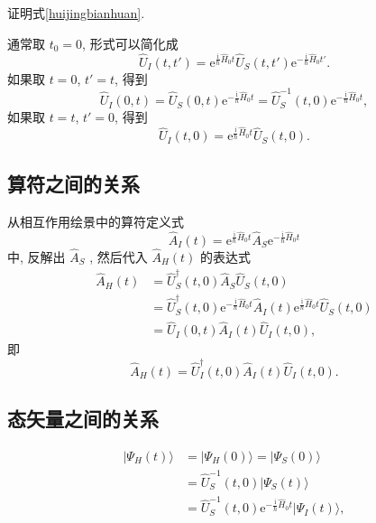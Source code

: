 \begin{question}{}{}
证明式\eqref{huijingbianhuan}.
\end{question}

通常取 $t_0=0$, 形式可以简化成
\begin{equation}
   \hat U_I(t, t')=\mathrm e^{\frac{\mathrm i}{\hbar}\hat H_0t}\hat U_S(t, t')\mathrm e^{-\frac{\mathrm i}{\hbar}\hat H_0t'}. 
\end{equation}
如果取 $t=0$, $t'=t$, 得到
\begin{equation}
   \hat U_I(0, t)=\hat U_S(0, t)\mathrm e^{-\frac{\mathrm i}{\hbar}\hat H_0t}=\hat U_S^{-1}(t, 0)\mathrm e^{-\frac{\mathrm i}{\hbar}\hat H_0t}, 
\end{equation}
如果取 $t=t$, $t'=0$, 得到
\begin{equation}
   \hat U_I(t, 0)=\mathrm e^{\frac{\mathrm i}{\hbar}\hat H_0t}\hat U_S(t, 0). 
\end{equation}

\subsection{ 算符之间的关系}

从相互作用绘景中的算符定义式
\begin{equation}
   \hat A_I(t)=\mathrm e^{\frac{\mathrm i}{\hbar}\hat H_0t}\hat A_S\mathrm e^{-\frac{\mathrm i}{\hbar}\hat H_0t}
\end{equation}
中, 反解出 $\hat A_S$ , 然后代入 $\hat A_H(t)$ 的表达式
\begin{align}
      \hat A_H(t)&=\hat U_S^\dagger (t, 0)\hat A_S\hat U_S(t, 0)\nonumber\\
      &=\hat U_S^\dagger(t, 0)\mathrm e^{-\frac{\mathrm i}{\hbar}\hat H_0t}\hat A_I(t)\mathrm e^{\frac{\mathrm i}{\hbar}\hat H_0t}\hat U_S(t, 0)\nonumber\\
      &=\hat U_I(0, t)\hat A_I(t)\hat U_I(t, 0), 
      \end{align}
即
\begin{equation}
   \boxed{\hat A_H(t)=\hat U_I^\dagger(t, 0)\hat A^{}_I(t)\hat U^{}_I(t, 0). }
\end{equation}

\subsection{态矢量之间的关系}

   \begin{align}
      |\Psi_H(t)\rangle&=|\Psi_H(0)\rangle
      =|\Psi_S(0)\rangle\nonumber\\
      &=\hat U_S^{-1}(t, 0)|\Psi^{}_S(t)\rangle\nonumber\\
      &=\hat U_S^{-1}(t, 0)\mathrm e^{-\frac{\mathrm i}{\hbar}\hat H_0t}|\Psi^{}_I(t)\rangle, 
      \end{align}

